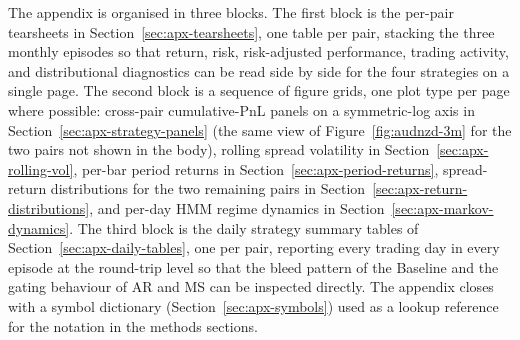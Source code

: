 The appendix is organised in three blocks. The first block is the per-pair tearsheets in Section~\ref{sec:apx-tearsheets}, one table per pair, stacking the three monthly episodes so that return, risk, risk-adjusted performance, trading activity, and distributional diagnostics can be read side by side for the four strategies on a single page. The second block is a sequence of figure grids, one plot type per page where possible: cross-pair cumulative-PnL panels on a symmetric-log axis in Section~\ref{sec:apx-strategy-panels} (the same view of Figure~\ref{fig:audnzd-3m} for the two pairs not shown in the body), rolling spread volatility in Section~\ref{sec:apx-rolling-vol}, per-bar period returns in Section~\ref{sec:apx-period-returns}, spread-return distributions for the two remaining pairs in Section~\ref{sec:apx-return-distributions}, and per-day HMM regime dynamics in Section~\ref{sec:apx-markov-dynamics}. The third block is the daily strategy summary tables of Section~\ref{sec:apx-daily-tables}, one per pair, reporting every trading day in every episode at the round-trip level so that the bleed pattern of the Baseline and the gating behaviour of AR and MS can be inspected directly. The appendix closes with a symbol dictionary (Section~\ref{sec:apx-symbols}) used as a lookup reference for the notation in the methods sections.








\newpage


